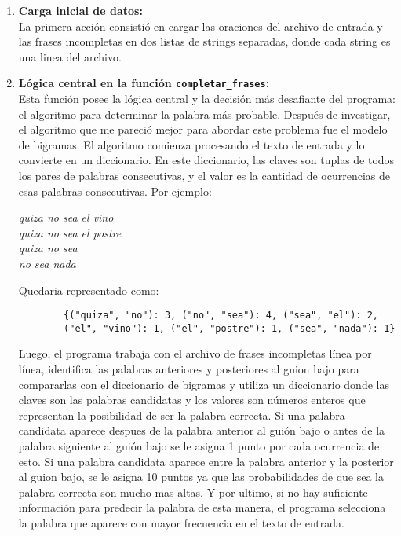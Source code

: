 \documentclass{article}
\begin{document}
\begin{enumerate}
    \item \textbf{Carga inicial de datos:} \\
    La primera acción consistió en cargar las oraciones del archivo de entrada y las frases incompletas en
     dos listas de strings separadas, donde cada string es una linea del archivo.
    
    \item \textbf{Lógica central en la función \texttt{completar\_frases}:} \\
    Esta función posee la lógica central y la decisión más desafiante del programa: el algoritmo para determinar la palabra 
    más probable. Después de investigar, el algoritmo que me pareció mejor para abordar este problema fue el
    modelo de bigramas. 
    El algoritmo comienza procesando el texto de entrada y lo convierte en un diccionario. En este diccionario,
     las claves son tuplas de todos los pares de palabras consecutivas, y el valor es la cantidad de
      ocurrencias de esas palabras consecutivas. Por ejemplo:


    
    \begin{center}
        \centering
        \textit{quiza no sea el vino} \\
        \textit{quiza no sea el postre} \\
        \textit{quiza no sea} \\
        \textit{no sea nada}
    \end{center}

    Quedaria representado como:

    \begin{verbatim}
        {("quiza", "no"): 3, ("no", "sea"): 4, ("sea", "el"): 2, 
        ("el", "vino"): 1, ("el", "postre"): 1, ("sea", "nada"): 1}
    \end{verbatim}

    Luego, el programa trabaja con el archivo de frases incompletas línea por línea, identifica las
     palabras anteriores y posteriores al guion bajo para compararlas con el diccionario de bigramas y 
     utiliza un diccionario donde las claves son las palabras candidatas y los valores son números
       enteros que representan la posibilidad de ser la palabra correcta.
        Si una palabra candidata aparece despues de la palabra anterior al guión bajo o antes de 
        la palabra siguiente al guión bajo se le asigna 1 punto por cada ocurrencia de esto.
       Si una palabra candidata aparece entre la palabra anterior y la posterior al guion bajo, se
        le asigna 10 puntos ya que las probabilidades de que
        sea la palabra correcta son mucho mas altas.
        Y por ultimo, si no hay suficiente información para 
        predecir la palabra de esta manera, el programa selecciona la palabra que aparece con mayor
         frecuencia en el texto de entrada.



\end{enumerate}
\end{document}

